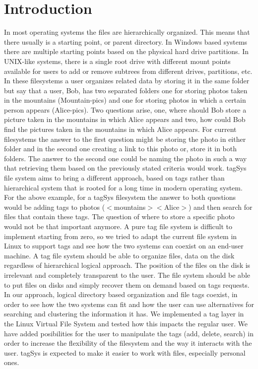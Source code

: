 \section{Introduction}
In most operating systems the files are hierarchically organized. 
This means that there usually is a starting point, or parent directory. 
In Windows based systems there are multiple starting points 
based on the physical hard drive partitions. In UNIX-like systems, 
there is a single root drive with different mount points available for users
to add or remove subtrees from different drives, partitions, etc. 
In these filesystems a user organizes related data by storing it in the same 
folder but say that a user, Bob, has two separated folders one for storing
photos taken in the mountains (Mountain-pics) and one for storing photos in which 
a certain person appears (Alice-pics). Two questions arise, one, where should 
Bob store a picture taken in the mountains in which Alice appears and two, how 
could Bob find the pictures taken in the mountains in which Alice appears. For 
current
filesystems the answer to the first question might be storing the photo in either
folder and in the second one creating a link to this photo or, store it in both
folders. The answer to the second one could be naming the photo in such a way
that retrieving them based on the previously stated criteria would work. 
tagSys file system aims to bring a different approach, based on tags rather than 
hierarchical system that is rooted for a long time in modern operating system. 
For the above example, for a tagSys filesystem the answer to both questions would
be adding tags to photos ($<$mountains$><$Alice$>$) and then search for files that 
contain these tags. The question of where to store a specific photo 
 would not be that important anymore. 
A pure tag file system is difficult to implement starting from zero, so we tried
to adapt the current file system in Linux to support tags and see how the two 
systems can coexist on an end-user machine. 
A tag file system should be able to organize files, data on the disk regardless of 
hierarchical logical approach. The position of the files on the disk is irrelevant and 
completely transparent to the user. The file system should be able to put files on disks
and simply recover them on demand based on tags requests. 
In our approach, logical directory based organization and file tags coexist, in order
to see how the two systems can fit and how the user can use alternatives for searching
and clustering the information it has. 
We implemented a tag layer in the Linux Virtual File System and tested how this impacts 
the regular user. We have added posibilities for the user to manipulate the tags (add, delete,
 search) in order to increase the flexibility of the filesystem and the way it interacts with the user.
tagSys is expected to make it easier to work with files, especially personal ones.

